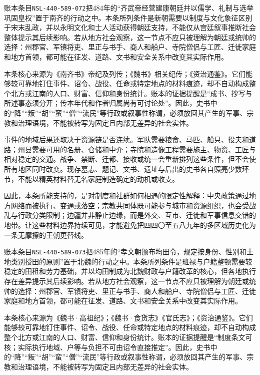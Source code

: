 账本条目\texttt{NSL-440-589-072}把484年的“齐武帝经营建康朝廷并以儒学、礼制与选举巩固皇权”置于南齐的行动之中。本条所列条件是新朝需要以制度与文化象征区别于宋末乱政，并以永明文化和士人活动获得朝廷支持，不能仅从宫廷叙事推断社会整体提示其后续影响。若从地方社会观察，这一节点不应只被理解为朝廷或统帅的选择：州郡官、军镇将吏、里正与书手、商人和船户、寺院僧侣与工匠、迁徙家庭和地方首领，都可能在征发、道路、文书和安全关系中改变其实际作用。

本条核心来源为《南齐书》帝纪及列传；《魏书》相关纪传；《资治通鉴》。它们能够较可靠地钉住事件、诏令、战役、任命或特定地点的材料痕迹，却不自动构成整个北方或江南的人口、财富、信仰和身份统计。账本的证据提醒是“成书、抄写与所述事态须分开；传本年代和作者归属尚有可讨论处”。因此，史书中的“降”“叛”“胡”“蛮”“僧”“流民”等行政或叙事性称谓，必须放回其产生的军事、宗教和治理语境，不能被转写为固定且内部无差异的社会实体。

事件的地域后果还取决于资源链是否连续。军队需要粮食、马匹、船只、役夫和道路；州县需要可用的名册、仓储和中介；寺院和造像工程需要施主、物资、工匠与相对稳定的交通。战争、禁断、迁都、接收或统一会重新排列这些条件，但不会使所有地区同时改变。现存墓志、题记、文书、遗址与后出的史书各自照亮少数环节，不能以精英材料替无名家庭制造确定的动机或收支。

因此，本条所能支持的，是对制度和社群如何相遇的限定性解释：中央政策通过地方网络而被执行、变通或落空；宗教共同体既可能参与城市和资源组织，也会受战乱与行政分类限制；边疆并非静止边缘，而是外交、互市、迁徙和军事信息交错的地带。让这些材料边界持续可见，才能避免把四四〇至五八九年的多区域历史化为一条无摩擦的王朝更替线。

账本条目\texttt{NSL-440-589-073}把485年的“孝文朝颁布均田令，规定按身份、性别和土地类别授田的原则”置于北魏的行动之中。本条所列条件是班禄与户籍整顿需要较稳定的田租和劳力基础，并以均田制成为北魏财政与户籍改革的核心，但各地执行存在差异提示其后续影响。若从地方社会观察，这一节点不应只被理解为朝廷或统帅的选择：州郡官、军镇将吏、里正与书手、商人和船户、寺院僧侣与工匠、迁徙家庭和地方首领，都可能在征发、道路、文书和安全关系中改变其实际作用。

本条核心来源为《魏书·高祖纪》；《魏书·食货志》《官氏志》；《资治通鉴》。它们能够较可靠地钉住事件、诏令、战役、任命或特定地点的材料痕迹，却不自动构成整个北方或江南的人口、财富、信仰和身份统计。账本的证据提醒是“制度条文可核；实际执行地域、户等与负担不可由诏令直接推定”。因此，史书中的“降”“叛”“胡”“蛮”“僧”“流民”等行政或叙事性称谓，必须放回其产生的军事、宗教和治理语境，不能被转写为固定且内部无差异的社会实体。

